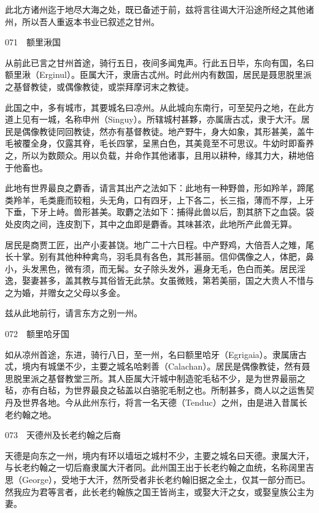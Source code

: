 \documentclass[12pt,UTF8]{ctexbook}
\begin{document}
此北方诸州迄于地尽大海之处，既已备述于前，兹将言往谒大汗沿途所经之其他诸州，所以吾人重返本书业已叙述之甘州。





071　额里湫国

从前此已言之甘州首途，骑行五日，夜间多闻鬼声。行此五日毕，东向有国，名曰额里湫（Erginul）。臣属大汗，隶唐古忒州。时此州内有数国，居民是聂思脱里派之基督教徒，或偶像教徒，或崇拜摩诃末之教徒。

此国之中，多有城市，其要城名曰凉州。从此城向东南行，可至契丹之地，在此方道上见有一城，名称申州（Singuy）。所辖城村甚夥，亦属唐古忒，隶于大汗。居民是偶像教徒同回教徒，然亦有基督教徒。地产野牛，身大如象，其形甚美，盖牛毛被覆全身，仅露其脊，毛长四掌，呈黑白色，其美竟至不可思议。牛幼时即畜养之，所以为数颇众。用以负载，并命作其他诸事，且用以耕种，缘其力大，耕地倍于他畜也。

此地有世界最良之麝香，请言其出产之法如下：此地有一种野兽，形如羚羊，蹄尾类羚羊，毛类鹿而较粗，头无角，口有四牙，上下各二，长三指，薄而不厚，上牙下垂，下牙上峙。兽形甚美。取麝之法如下：捕得此兽以后，割其脐下之血袋。袋处皮肉之间，连皮割下，其中之血即是麝香。其味甚浓，此地所产此兽无算。

居民是商贾工匠，出产小麦甚饶。地广二十六日程。中产野鸡，大倍吾人之雉，尾长十掌。别有其他种种禽鸟，羽毛具有各色，其形甚丽。信仰偶像之人，体肥，鼻小，头发黑色，微有须，而无髯。女子除头发外，遍身无毛，色白而美。居民淫逸，娶妻甚多，盖其教与其俗皆无此禁。女虽微贱，第若美丽，国之大贵人不惜与之为婚，并赠女之父母以多金。

兹从此地前行，请言东方之别一州。





072　额里哈牙国

如从凉州首途，东进，骑行八日，至一州，名曰额里哈牙（Egrigaia）。隶属唐古忒，境内有城堡不少，主要之城名哈剌善（Calachan）。居民是偶像教徒，然有聂思脱里派之基督教堂三所。其人臣属大汗城中制造驼毛毡不少，是为世界最丽之毡，亦有白毡，为世界最良之毡盖以白骆驼毛制之也。所制甚多，商人以之运售契丹及世界各地。今从此州东行，将言一名天德（Tenduc）之州，由是进入昔属长老约翰之地。





073　天德州及长老约翰之后裔

天德是向东之一州，境内有环以墙垣之城村不少，主要之城名曰天德。隶属大汗，与长老约翰之一切后裔隶属大汗者同。此州国王出于长老约翰之血统，名称阔里吉思（George），受地于大汗，然所受者非长老约翰旧据之全土，仅其一部分而已。然我应为君等言者，此长老约翰族之国王皆尚主，或娶大汗之女，或娶皇族公主为妻。
\end{document}

